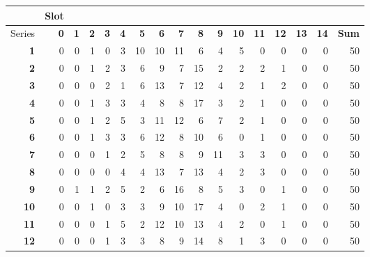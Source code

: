 \documentclass{scrreprt}
\begin{document}
\begin{table}[H]
    \begin{tabular}{r|r|r|r|r|r|r|r|r|r|r|r|r|r|r|r||r}
          & Slot  &       &       &       &       &       &       &       &       &       &       &       &       &       &       &  \\
    \hline
    Series & \textbf{0} & \textbf{1} & \textbf{2} & \textbf{3} & \textbf{4} & \textbf{5} & \textbf{6} & \textbf{7} & \textbf{8} & \textbf{9} & \textbf{10} & \textbf{11} & \textbf{12} & \textbf{13} & \textbf{14} & \textbf{Sum} \\ \hline
    \textbf{1} & 0     & 0     & 1     & 0     & 3     & 10    & 10    & 11    & 6     & 4     & 5     & 0     & 0     & 0     & 0     & 50 \\
    \textbf{2} & 0     & 0     & 1     & 2     & 3     & 6     & 9     & 7     & 15    & 2     & 2     & 2     & 1     & 0     & 0     & 50 \\
    \textbf{3} & 0     & 0     & 0     & 2     & 1     & 6     & 13    & 7     & 12    & 4     & 2     & 1     & 2     & 0     & 0     & 50 \\
    \textbf{4} & 0     & 0     & 1     & 3     & 3     & 4     & 8     & 8     & 17    & 3     & 2     & 1     & 0     & 0     & 0     & 50 \\
    \textbf{5} & 0     & 0     & 1     & 2     & 5     & 3     & 11    & 12    & 6     & 7     & 2     & 1     & 0     & 0     & 0     & 50 \\
    \textbf{6} & 0     & 0     & 1     & 3     & 3     & 6     & 12    & 8     & 10    & 6     & 0     & 1     & 0     & 0     & 0     & 50 \\
    \textbf{7} & 0     & 0     & 0     & 1     & 2     & 5     & 8     & 8     & 9     & 11    & 3     & 3     & 0     & 0     & 0     & 50 \\
    \textbf{8} & 0     & 0     & 0     & 0     & 4     & 4     & 13    & 7     & 13    & 4     & 2     & 3     & 0     & 0     & 0     & 50 \\
    \textbf{9} & 0     & 1     & 1     & 2     & 5     & 2     & 6     & 16    & 8     & 5     & 3     & 0     & 1     & 0     & 0     & 50 \\
    \textbf{10} & 0     & 0     & 1     & 0     & 3     & 3     & 9     & 10    & 17    & 4     & 0     & 2     & 1     & 0     & 0     & 50 \\
    \textbf{11} & 0     & 0     & 0     & 1     & 5     & 2     & 12    & 10    & 13    & 4     & 2     & 0     & 1     & 0     & 0     & 50 \\
    \textbf{12} & 0     & 0     & 0     & 1     & 3     & 3     & 8     & 9     & 14    & 8     & 1     & 3     & 0     & 0     & 0     & 50 \\

\end{tabular}
\end{table}
\end{document}
